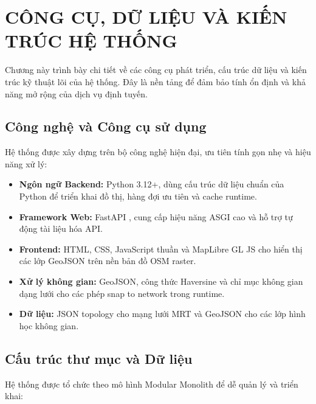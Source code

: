 ﻿\documentclass[../DoAn.tex]{subfiles}
\begin{document}
\chapter{CÔNG CỤ, DỮ LIỆU VÀ KIẾN TRÚC HỆ THỐNG}
\label{chapter:technology}

Chương này trình bày chi tiết về các công cụ phát triển, cấu trúc dữ liệu và kiến trúc kỹ thuật lõi của hệ thống. Đây là nền tảng để đảm bảo tính ổn định và khả năng mở rộng của dịch vụ định tuyến.

\section{Công nghệ và Công cụ sử dụng}
Hệ thống được xây dựng trên bộ công nghệ hiện đại, ưu tiên tính gọn nhẹ và hiệu năng xử lý:
\begin{itemize}
    \item \textbf{Ngôn ngữ Backend:} Python 3.12+, dùng cấu trúc dữ liệu chuẩn của Python để triển khai đồ thị, hàng đợi ưu tiên và cache runtime.
    \item \textbf{Framework Web:} FastAPI \cite{fastapi}, cung cấp hiệu năng ASGI cao và hỗ trợ tự động tài liệu hóa API.
    \item \textbf{Frontend:} HTML, CSS, JavaScript thuần và MapLibre GL JS \cite{maplibre} cho hiển thị các lớp GeoJSON trên nền bản đồ OSM raster.
    \item \textbf{Xử lý không gian:} GeoJSON, công thức Haversine và chỉ mục không gian dạng lưới cho các phép snap to network trong runtime.
    \item \textbf{Dữ liệu:} JSON topology cho mạng lưới MRT và GeoJSON \cite{geojson} cho các lớp hình học không gian.
\end{itemize}

\section{Cấu trúc thư mục và Dữ liệu}
Hệ thống được tổ chức theo mô hình Modular Monolith để dễ quản lý và triển khai:
\end{document}
